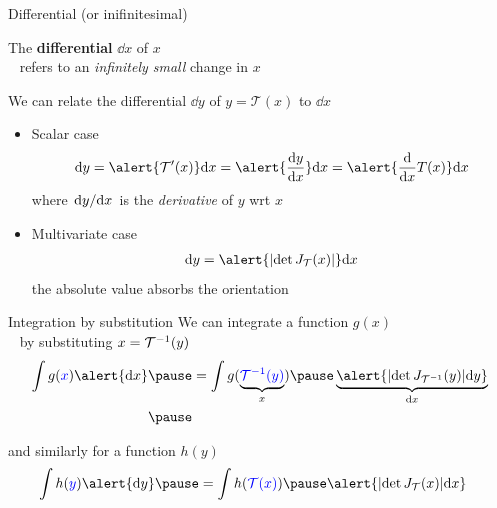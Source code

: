 \begin{frame}{Differential (or inifinitesimal)}

	The {\bf differential} $\dd x$ of $x$ \\
	~ refers to an \emph{infinitely small} change in $x$\\ \pause
	\vspace{10pt}

	We can relate the differential $\dd y$ of $y = \mathcal T(x)$ to $\dd x$ \pause
	\begin{itemize}
		\item Scalar case
		\begin{equation*}
			\dd y = \alert{\mathcal T'(x)} \dd x = \alert{\dv{y}{x}} \dd x = \alert{\dv{x}T(x)} \dd x
		\end{equation*}
		where \alert{$\dv*{y}{x}$} is the \emph{derivative} of $y$ wrt $x$ \pause
		\item Multivariate case
		\begin{equation*}
        			\begin{aligned}
			        \dd y = \alert{\djac{\mathcal T}{x}} \dd x %
		        	\end{aligned}
	        	\end{equation*}
		the absolute value absorbs the orientation 
	\end{itemize}

\end{frame}

\begin{frame}{Integration by substitution}	
	We can integrate a function $g(x)$ \\
	~ by substituting $x = { \mathcal T}^{-1}(y)$
	\begin{equation*}
	\begin{aligned}
		\int g(\balert{x}) \alert{\dd x} \pause &= \int g(\underbrace{\balert{\inv{\mathcal T}(y)}}_{x}) \pause \underbrace{\alert{\djac{\inv{\mathcal T}}{y} \dd y}}_{\dd x} \\ \pause
	\end{aligned}
	\end{equation*}
	
	\vspace{-10pt}
	and similarly for a function $h(y)$
	\begin{equation*}
	\begin{aligned}
		\int h(\balert{y}) \alert{\dd y} \pause &= \int h(\balert{\mathcal T(x)}) \pause \alert{\djac{\mathcal T}{x} \dd x}
	\end{aligned}
	\end{equation*} 

\end{frame}

